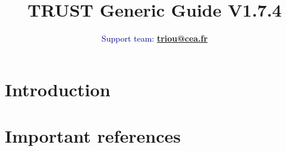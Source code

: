 \documentclass[a4paper,12pt,english]{report}
\begin{document}
\title{\huge \bfseries{TRUST Generic Guide V1.7.4}}
\author{\Large \textcolor{darkblue}{Support team: \textbf{\href{mailto:triou@cea.fr}{triou@cea.fr}}}}

\maketitle
\tableofcontents{}
\newpage







%
\chapter{Introduction}
%




%
\chapter{Important references}
%

\end{document}
